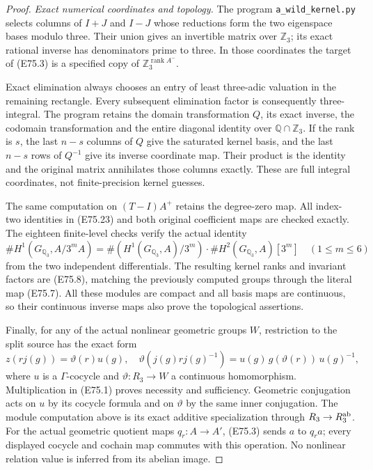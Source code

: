 \begin{proof}
\emph{Exact numerical coordinates and topology.}
The program \texttt{a\_wild\_kernel.py} selects
columns of $I+J$ and $I-J$ whose reductions
form the two eigenspace bases modulo three.
Their union gives an invertible matrix over
$\mathbb Z_3$; its exact rational inverse
has denominators prime to three. In those
coordinates the target of (E75.3) is a
specified copy of $\mathbb Z_3^{\operatorname{rank}A^-}$.

Exact elimination always chooses an entry
of least three-adic valuation in the
remaining rectangle. Every subsequent
elimination factor is consequently
three-integral. The program retains the
domain transformation $Q$, its exact inverse,
the codomain transformation and the entire
diagonal identity over $\mathbb Q\cap\mathbb Z_3$.
If the rank is $s$, the last $n-s$ columns
of $Q$ give the saturated kernel basis,
and the last $n-s$ rows of $Q^{-1}$ give
its inverse coordinate map. Their product
is the identity and the original matrix
annihilates those columns exactly.
These are full integral coordinates, not
finite-precision kernel guesses.

The same computation on $(T-I)A^+$ retains
the degree-zero map. All index-two identities
in (E75.23) and both original coefficient
maps are checked exactly. The eighteen
finite-level checks verify the actual
identity
\[
 \#H^1(G_{\mathbb Q_3},A/3^mA)
  =\#(H^1(G_{\mathbb Q_3},A)/3^m)
       \cdot\#H^2(G_{\mathbb Q_3},A)[3^m]
 \quad(1\le m\le6)
 \tag{E75.24}
\]
from the two independent differentials.
The resulting kernel ranks and invariant
factors are (E75.8), matching the previously
computed groups through the literal map
(E75.7). All these modules are compact and
all basis maps are continuous, so their
continuous inverse maps also prove the
topological assertions.

Finally, for any of the actual nonlinear
geometric groups $W$, restriction to the
split source has the exact form
\[
 z(rj(g))=\vartheta(r)u(g),\quad
 \vartheta(j(g)rj(g)^{-1})
   =u(g)\,g(\vartheta(r))\,u(g)^{-1},
 \tag{E75.25}
\]
where $u$ is a $\Gamma$-cocycle and
$\vartheta:R_3\to W$ a continuous
homomorphism. Multiplication in (E75.1)
proves necessity and sufficiency. Geometric
conjugation acts on $u$ by its cocycle
formula and on $\vartheta$ by the same
inner conjugation. The module computation
above is its exact additive specialization
through $R_3\to R_3^{\rm ab}$.
For the actual geometric quotient maps
$q_r:A\to A'$, (E75.3) sends $a$ to $q_ra$;
every displayed cocycle and cochain map
commutes with this operation. No nonlinear
relation value is inferred from its
abelian image.
\end{proof}
